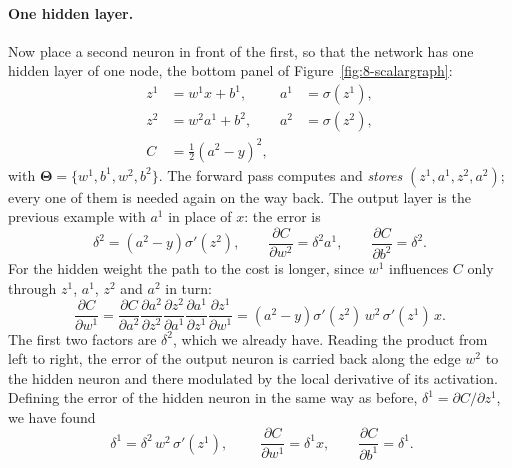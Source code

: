 \paragraph{One hidden layer.}
Now place a second neuron in front of the first, so that the network has one
hidden layer of one node, the bottom panel of Figure~\ref{fig:8-scalargraph}:
\begin{equation}
  \begin{aligned}
    z^{1} &= w^{1}x+b^{1},      & a^{1} &= \sigma\!\left(z^{1}\right),\\
    z^{2} &= w^{2}a^{1}+b^{2},  & a^{2} &= \sigma\!\left(z^{2}\right),\\
    C &= \tfrac12\left(a^{2}-y\right)^{2},
  \end{aligned}
  \label{eq:8-scalartwo}
\end{equation}
with $\bm{\Theta}=\{w^{1},b^{1},w^{2},b^{2}\}$.  The forward pass computes
and \emph{stores} $(z^{1},a^{1},z^{2},a^{2})$; every one of them is needed
again on the way back.  The output layer is the previous example with $a^{1}$
in place of $x$: the error is
\begin{equation}
  \delta^{2} = \left(a^{2}-y\right)\sigma'\!\left(z^{2}\right),
  \qquad
  \frac{\partial C}{\partial w^{2}} = \delta^{2}a^{1},
  \qquad
  \frac{\partial C}{\partial b^{2}} = \delta^{2} .
  \label{eq:8-scalardelta2}
\end{equation}
For the hidden weight the path to the cost is longer, since $w^{1}$
influences $C$ only through $z^{1}$, $a^{1}$, $z^{2}$ and $a^{2}$ in turn:
\begin{equation}
  \frac{\partial C}{\partial w^{1}}
   = \frac{\partial C}{\partial a^{2}}
     \frac{\partial a^{2}}{\partial z^{2}}
     \frac{\partial z^{2}}{\partial a^{1}}
     \frac{\partial a^{1}}{\partial z^{1}}
     \frac{\partial z^{1}}{\partial w^{1}}
   = \left(a^{2}-y\right)\sigma'\!\left(z^{2}\right)\,w^{2}\,
     \sigma'\!\left(z^{1}\right)\,x .
  \label{eq:8-scalartwow}
\end{equation}
The first two factors are $\delta^{2}$, which we already have.  Reading the
product from left to right, the error of the output neuron is carried back
along the edge $w^{2}$ to the hidden neuron and there modulated by the local
derivative of its activation.  Defining the error of the hidden neuron in the
same way as before, $\delta^{1}=\partial C/\partial z^{1}$, we have found
\begin{equation}
  \boxed{\;\delta^{1} = \delta^{2}\,w^{2}\,\sigma'\!\left(z^{1}\right),\;}
  \qquad
  \frac{\partial C}{\partial w^{1}} = \delta^{1}x,
  \qquad
  \frac{\partial C}{\partial b^{1}} = \delta^{1} .
  \label{eq:8-scalardeltarec}
\end{equation}
